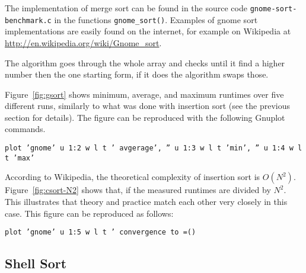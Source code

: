 \documentclass[a4paper,10pt]{article}
\begin{document}
The implementation of merge sort can be found in the source code \texttt{gnome\--sort\--benchmark.c} in the functions \texttt{gnome\_sort()}.
Examples of gnome sort implementations are easily found on the internet, for example on Wikipedia at \url{http://en.wikipedia.org/wiki/Gnome_sort}.

The algorithm goes through the whole array and checks until it find a higher number then the one starting form, if it does the algorithm swaps those.

Figure~\ref{fig:gsort} shows minimum, average, and maximum runtimes over five different runs, similarly to what was done with insertion sort (see the previous section for details).
The figure can be reproduced with the following Gnuplot commands.


\smallskip
 \texttt{plot 'gnome' u 1:2 w l t ' avgerage', '' u 1:3 w l t 'min', '' u 1:4 w l t 'max'}
\smallskip

According to Wikipedia, the theoretical complexity of insertion sort is $O(N^2)$.
Figure~\ref{fig:csort-N2} shows that, if the measured runtimes are divided by $N^2$.
This illustrates that theory and practice match each other very closely in this case.
This figure can be reproduced as follows:

\smallskip
 \texttt{plot 'gnome' u 1:5 w l t ' convergence to =()}
\smallskip




\subsection*{Shell Sort}
\end{document}
